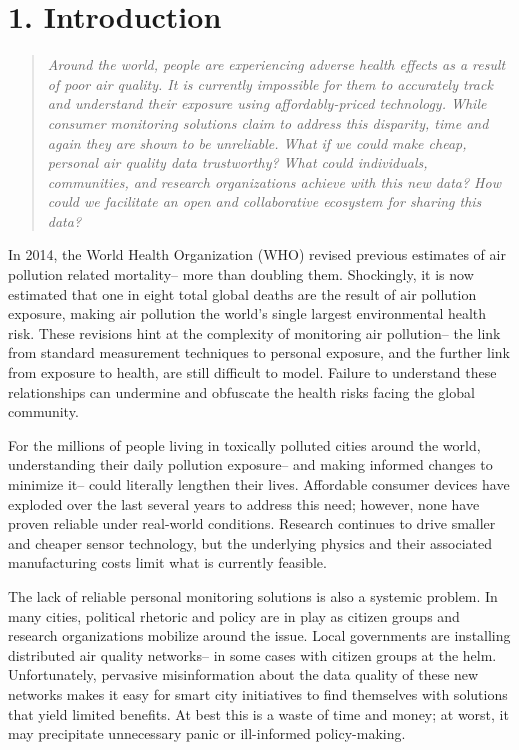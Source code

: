 \chapter{1. Introduction}

\begin{quote}
\textit{Around the world, people are experiencing adverse health effects as a result of poor air quality.  It is currently impossible for them to accurately track and understand their exposure using affordably-priced technology.  While consumer monitoring solutions claim to address this disparity, time and again they are shown to be unreliable. \newline 	What if we could make cheap, personal air quality data trustworthy?  What could individuals, communities, and research organizations achieve with this new data?  How could we facilitate an open and collaborative ecosystem for sharing this data?} 
\newline
\end{quote}

In 2014, the World Health Organization (WHO) revised previous estimates of air pollution related mortality-- more than doubling them. \cite{who2014} Shockingly, it is now estimated that one in eight total global deaths are the result of air pollution exposure, making air pollution the world's single largest environmental health risk. \cite{who2014, who2014_2}  These revisions hint at the complexity of monitoring air pollution-- the link from standard measurement techniques to personal exposure, and the further link from exposure to health, are still difficult to model.  Failure to understand these relationships can undermine and obfuscate the health risks facing the global community. \cite{who2014, who2014_2, filley1954, allred1989, schwartz2005}

For the millions of people living in toxically polluted cities around the world, understanding their daily pollution exposure-- and making informed changes to minimize it-- could literally lengthen their lives.  Affordable consumer devices have exploded over the last several years to address this need; however, none have proven reliable under real-world conditions. \cite{williams2014}  Research continues to drive smaller and cheaper sensor technology, but the underlying physics and their associated manufacturing costs limit what is currently feasible.

The lack of reliable personal monitoring solutions is also a systemic problem.  In many cities, political rhetoric and policy are in play as citizen groups and research organizations mobilize around the issue.  Local governments are installing distributed air quality networks-- in some cases with citizen groups at the helm.  Unfortunately, pervasive misinformation about the data quality of these new networks makes it easy for smart city initiatives to find themselves with solutions that yield limited benefits.  At best this is a waste of time and money; at worst, it may precipitate unnecessary panic or ill-informed policy-making.  


